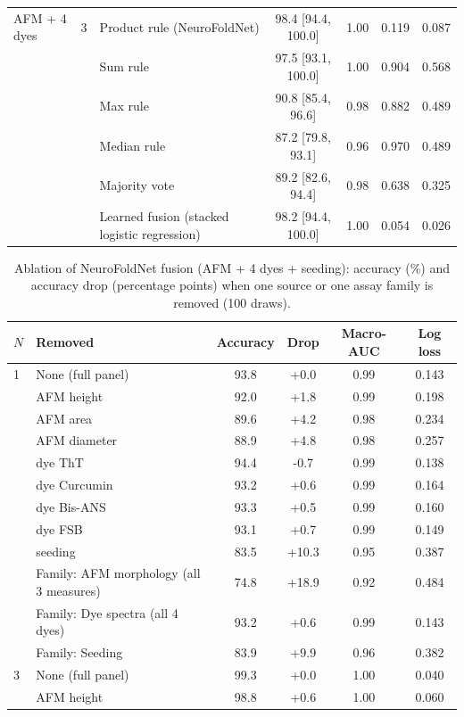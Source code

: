\begin{table}[!htbp]
\begin{tabular}{llp{4.2cm}cccc}
AFM + 4 dyes & 3 & Product rule (NeuroFoldNet) & 98.4 [94.4, 100.0] & 1.00 & 0.119 & 0.087 \\
 &  & Sum rule & 97.5 [93.1, 100.0] & 1.00 & 0.904 & 0.568 \\
 &  & Max rule & 90.8 [85.4, 96.6] & 0.98 & 0.882 & 0.489 \\
 &  & Median rule & 87.2 [79.8, 93.1] & 0.96 & 0.970 & 0.489 \\
 &  & Majority vote & 89.2 [82.6, 94.4] & 0.98 & 0.638 & 0.325 \\
 &  & Learned fusion (stacked logistic regression) & 98.2 [94.4, 100.0] & 1.00 & 0.054 & 0.026 \\
\bottomrule
\end{tabular}
\end{table}

\begin{table}[!htbp]
\centering\scriptsize
\caption{Ablation of NeuroFoldNet fusion (AFM + 4 dyes + seeding): accuracy (\%) and accuracy drop (percentage points) when one source or one assay family is removed (100 draws).}\label{tab:s_ablation}
\begin{tabular}{llcccc}
\toprule
\textbf{$N$} & \textbf{Removed} & \textbf{Accuracy} & \textbf{Drop} & \textbf{Macro-AUC} & \textbf{Log loss} \\
\midrule
1 & None (full panel) & 93.8 & +0.0 & 0.99 & 0.143 \\
 & AFM height & 92.0 & +1.8 & 0.99 & 0.198 \\
 & AFM area & 89.6 & +4.2 & 0.98 & 0.234 \\
 & AFM diameter & 88.9 & +4.8 & 0.98 & 0.257 \\
 & dye ThT & 94.4 & -0.7 & 0.99 & 0.138 \\
 & dye Curcumin & 93.2 & +0.6 & 0.99 & 0.164 \\
 & dye Bis-ANS & 93.3 & +0.5 & 0.99 & 0.160 \\
 & dye FSB & 93.1 & +0.7 & 0.99 & 0.149 \\
 & seeding & 83.5 & +10.3 & 0.95 & 0.387 \\
 & Family: AFM morphology (all 3 measures) & 74.8 & +18.9 & 0.92 & 0.484 \\
 & Family: Dye spectra (all 4 dyes) & 93.2 & +0.6 & 0.99 & 0.143 \\
 & Family: Seeding & 83.9 & +9.9 & 0.96 & 0.382 \\
3 & None (full panel) & 99.3 & +0.0 & 1.00 & 0.040 \\
 & AFM height & 98.8 & +0.6 & 1.00 & 0.060 \\

\end{tabular}
\end{table}
